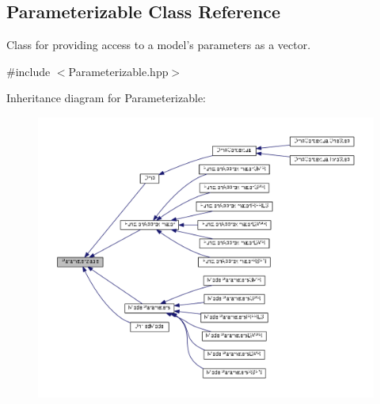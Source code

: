 \hypertarget{classDmpBbo_1_1Parameterizable}{\subsection{Parameterizable Class Reference}
\label{classDmpBbo_1_1Parameterizable}
}


Class for providing access to a model's parameters as a vector.  




{\ttfamily \#include $<$Parameterizable.\+hpp$>$}



Inheritance diagram for Parameterizable\+:
\nopagebreak
\begin{figure}[H]
\begin{center}
\leavevmode
\includegraphics[width=350pt]{classDmpBbo_1_1Parameterizable__inherit__graph}
\end{center}
\end{figure}
